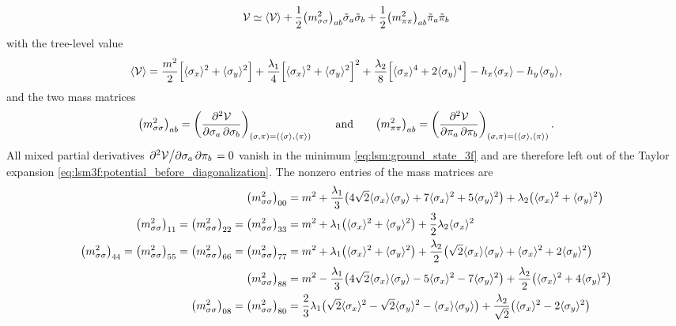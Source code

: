 \begin{equation}
	\mathcal{V} \simeq \langle \mathcal{V} \rangle + \frac12 \big(m^2_{\sigma\sigma}\big)_{ab} \tilde{\sigma}_a \tilde{\sigma}_b + \frac12 \big(m^2_{\pi\pi}\big)_{ab} \tilde{\pi}_a \tilde{\pi}_b
\label{eq:lsm3f:potential_before_diagonalization}
\end{equation}
with the tree-level value
\begin{equation}
	\langle \mathcal{V} \rangle = \frac{m^2}{2} \Big[ \langle \sigma_x \rangle^2 + \langle \sigma_y \rangle^2 \Big] + \frac{\lambda_1}{4} \Big[ \langle \sigma_x \rangle^2 + \langle \sigma_y \rangle^2 \Big]^2 + \frac{\lambda_2}{8} \Big[ \langle \sigma_x \rangle^4 + 2 \langle \sigma_y \rangle^4 \Big] - h_x \langle \sigma_x \rangle - h_y \langle \sigma_y \rangle,
\label{eq:lsm:potential_tree_3f}
\end{equation}
and the two mass matrices
\begin{equation}
	\big(m^2_{\sigma\sigma}\big)_{ab} = \pdv{\mathcal{V}}{\sigma_a, \sigma_b}_{(\sigma,\pi)=(\langle \sigma \rangle,\langle \pi \rangle)}
	\qquad \text{and} \qquad
	\big(m^2_{\pi\pi}\big)_{ab}       = \pdv{\mathcal{V}}{\pi_a, \pi_b}_{(\sigma,\pi)=(\langle \sigma \rangle,\langle \pi \rangle)}.
\end{equation}
All mixed partial derivatives $\pdv{\mathcal{V}}/{\sigma_a,\pi_b} = 0$ vanish in the minimum \eqref{eq:lsm:ground_state_3f} and are therefore left out of the Taylor expansion \eqref{eq:lsm3f:potential_before_diagonalization}.
The nonzero entries of the mass matrices are
\begin{equation}
\begin{split}
	\big(m^2_{\sigma\sigma}\big)_{00} &= m^2 + \frac{\lambda_1}{3} \big(4 \sqrt{2} \avg{\sigma_x} \avg{\sigma_y} + 7 \avg{\sigma_x}^2 + 5 \avg{\sigma_y}^2\big) + \lambda_2 \big(\avg{\sigma_x}^2 + \avg{\sigma_y}^2\big) \\
	\big(m^2_{\sigma\sigma}\big)_{11} =
	\big(m^2_{\sigma\sigma}\big)_{22} =
	\big(m^2_{\sigma\sigma}\big)_{33} &= m^2 + \lambda_1 \big(\avg{\sigma_x}^2 + \avg{\sigma_y}^2\big)                                              + \frac32 \lambda_2 \avg{\sigma_x}^2 \\
	\big(m^2_{\sigma\sigma}\big)_{44} =
	\big(m^2_{\sigma\sigma}\big)_{55} =
	\big(m^2_{\sigma\sigma}\big)_{66} =
	\big(m^2_{\sigma\sigma}\big)_{77} &= m^2 + \lambda_1 \big(\avg{\sigma_x}^2 + \avg{\sigma_y}^2\big) + \frac{\lambda_2}{2} \big(\sqrt{2} \avg{\sigma_x} \avg{\sigma_y} + \avg{\sigma_x}^2 + 2 \avg{\sigma_y}^2\big) \\
	\big(m^2_{\sigma\sigma}\big)_{88} &= m^2 - \frac{\lambda_1}{3} \big(4 \sqrt{2} \avg{\sigma_x} \avg{\sigma_y} - 5 \avg{\sigma_x}^2 - 7 \avg{\sigma_y}^2\big) + \frac{\lambda_2}{2} \big(\avg{\sigma_x}^2 + 4 \avg{\sigma_y}^2\big) \\
	\big(m^2_{\sigma\sigma}\big)_{08} =
	\big(m^2_{\sigma\sigma}\big)_{80} &= \frac23 \lambda_1 \big(\sqrt{2} \avg{\sigma_x}^2 - \sqrt{2} \avg{\sigma_y}^2 - \avg{\sigma_x} \avg{\sigma_y}\big) + \frac{\lambda_2}{\sqrt{2}} \big(\avg{\sigma_x}^2 - 2 \avg{\sigma_y}^2\big)
\end{split}%
\label{eq:lsm3f:mass_sigma_sigma}
\end{equation}%
